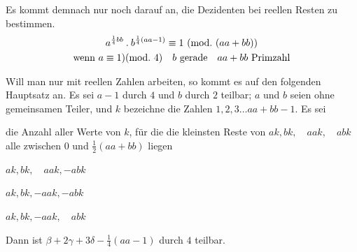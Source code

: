 Es kommt demnach nur noch darauf an, die Dezidenten bei reellen Resten zu bestimmen.
\[
\begin{gathered}
a^{\frac14bb}\mathbin{.} b^{\frac14(aa-1)}\equiv1\ (\mathrm{mod.}\ (aa+bb))\\
\text{wenn }a\equiv1)(\mathrm{mod.}\ 4)\quad b\text{ gerade}\quad aa+bb\text{ Primzahl}
\end{gathered}
\]

Will man nur mit reellen Zahlen arbeiten, so kommt es auf den folgenden Hauptsatz an. Es sei $a-1$ durch $4$ und $b$ durch $2$ teilbar; $a$ und $b$ seien ohne gemeinsamen Teiler, und $k$ bezeichne die Zahlen $1,2,3\ldots aa+bb-1$.
Es sei
\begin{list}{}{\setlength{\labelwidth}{1.5em}\setlength{\leftmargin}{2em}}
\item[$\alpha$] die Anzahl aller Werte von $k$, für die die kleinsten Reste von $ak,\allowbreak bk,\quad\allowbreak aak,\quad\allowbreak abk$ alle zwischen $0$ und $\frac12(aa+bb)$ liegen
\item[$\beta$] $ak,bk,\quad aak,-abk$
\item[$\gamma$] $ak,bk,-aak,-abk$
\item[$\delta$] $ak,bk,-aak,\quad abk$
\end{list}
Dann ist $\beta+2\gamma+3\delta-\frac14(aa-1)$ durch $4$ teilbar.
